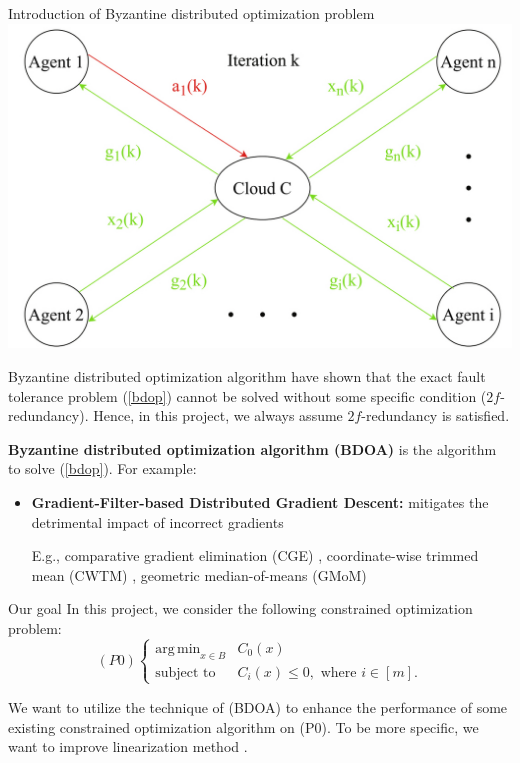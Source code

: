 \documentclass{beamer}
\DeclareMathOperator*{\argmin}{arg\,min}
\begin{document}
\begin{frame}{Introduction of Byzantine distributed optimization problem}
\includegraphics[scale=0.27]{fig/byzantine_fault.jpg} \cite {xu2022resilient} 
\end{frame}

\begin{frame}{Byzantine distributed optimization algorithm}
\cite{su2016fault, gupta2019byzantine1, gupta2019byzantine2, liu2021approximate} have shown that \alert{the exact fault tolerance problem (\ref{bdop}) cannot be solved} without some specific condition ($2f$-redundancy). Hence, in this project, we always assume $2f$-redundancy is satisfied. \newline

\textbf{Byzantine distributed optimization algorithm (BDOA)} is the algorithm to solve (\ref{bdop}). For example:

\begin{itemize}
    \item \textbf{Gradient-Filter-based Distributed Gradient Descent:} mitigates the detrimental impact of incorrect gradients
    \newline
    
     E.g., comparative gradient elimination (CGE) \cite {gupta2020byzantine3}, coordinate-wise trimmed mean (CWTM) \cite {su2016fault}, geometric median-of-means (GMoM) \cite {chen2017distributed}
\end{itemize}
    
\end{frame}

\begin{frame}{Our goal}
In this project, we consider the following constrained optimization problem:
$$
(P0)
\begin{cases}
    \argmin_{x\in B} &C_0(x)\\
    \text{subject to} &C_i(x) \leq 0, \text{ where } i \in [m].\label{P0}
\end{cases}
$$

We want to \alert{utilize the technique of (BDOA) to enhance the performance of some existing constrained optimization algorithm on (P0)}. To be more specific, we want to improve linearization method \cite{wilson2012linearization}.

\end{frame}
\end{document}
